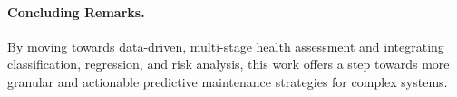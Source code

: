 \paragraph{Concluding Remarks.}
By moving towards data-driven, multi-stage health assessment and integrating classification, regression, and risk analysis, this work offers a step towards more granular and actionable predictive maintenance strategies for complex systems.

